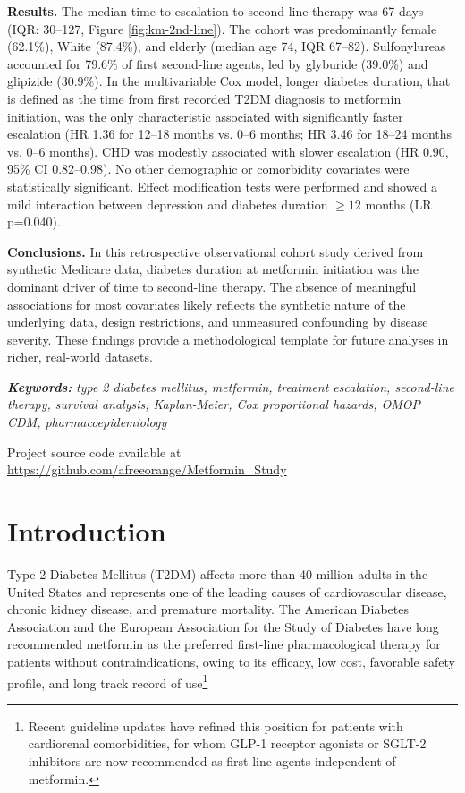 \documentclass[twoside,11pt]{article}
\begin{document}
\textbf{Results.} The median time to escalation to second line therapy was 67 days (IQR: 30--127, Figure \ref{fig:km-2nd-line}). The cohort was predominantly female (62.1\%), White (87.4\%), and elderly (median age 74, IQR 67--82). Sulfonylureas accounted for 79.6\% of first second-line agents, led by glyburide (39.0\%) and glipizide (30.9\%). In the multivariable Cox model, longer diabetes duration, that is defined as the time from first recorded T2DM diagnosis to metformin initiation, was the only characteristic associated with significantly faster escalation (HR 1.36 for 12--18 months vs. 0--6 months; HR 3.46 for 18--24 months vs. 0--6 months). CHD was modestly associated with slower escalation (HR 0.90, 95\% CI 0.82--0.98). No other demographic or comorbidity covariates were statistically significant. Effect modification tests were performed and showed a mild interaction between depression and diabetes duration $\geq 12$ months (LR p=0.040).

\textbf{Conclusions.} In this retrospective observational cohort study derived from synthetic Medicare data, diabetes duration at metformin initiation was the dominant driver of time to second-line therapy. The absence of meaningful associations for most covariates likely reflects the synthetic nature of the underlying data, design restrictions, and unmeasured confounding by disease severity. These findings provide a methodological template for future analyses in richer, real-world datasets.

\small{\textbf{\textit{Keywords:}} \textit{type 2 diabetes mellitus, metformin, treatment escalation, second-line therapy, survival analysis, Kaplan-Meier, Cox proportional hazards, OMOP CDM, pharmacoepidemiology}}

\small{Project source code available at \url{https://github.com/afreeorange/Metformin_Study}}


\newpage
\section*{Introduction}

Type 2 Diabetes Mellitus (T2DM) affects more than 40 million adults in the United States\cite{cdc_diabetes_stats_2026} and represents one of the leading causes of cardiovascular disease, chronic kidney disease, and premature mortality\cite{ada_soc_2026,cdc_diabetes_stats_2026}. The American Diabetes Association and the European Association for the Study of Diabetes have long recommended metformin as the preferred first-line pharmacological therapy for patients without contraindications, owing to its efficacy, low cost, favorable safety profile, and long track record of use\footnote{Recent guideline updates have refined this position for patients with cardiorenal comorbidities, for whom GLP-1 receptor agonists or SGLT-2 inhibitors are now recommended as first-line agents independent of metformin\cite{davies2022hyperglycemia, ada2025pharm}.}
\end{document}

